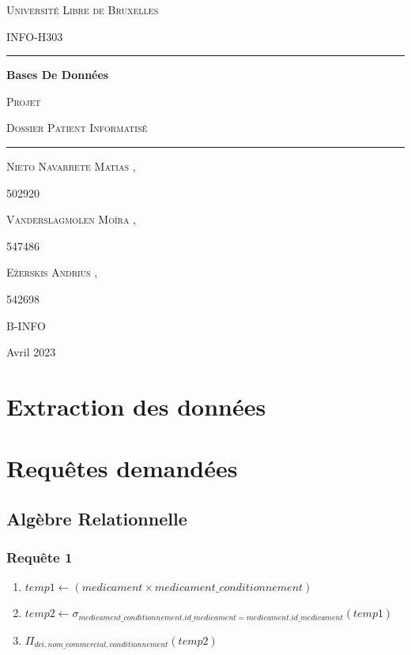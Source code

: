 \documentclass[utf8]{article}
\begin{document}
\begin{titlepage}
  \centering
  {\scshape\LARGE Université Libre de Bruxelles \par}
  \vspace{1cm}
  {\scshape\Large INFO-H303\par}
  \vspace{1.5cm}

  \noindent\rule{15cm}{0.4pt}
  \newline
  {\huge\bfseries Bases De Données\par}
  \vspace{0.5cm}
  {\scshape\Large Projet \par}
  \vspace{0.5cm}
  {\scshape\Large Dossier Patient Informatisé\par}
  \vspace{0.5cm}
  \noindent\rule{15cm}{0.4pt}
  \vfill

  {\Large\scshape Nieto Navarrete Matias , }
  {\Large\scshape 502920\par}
  {\Large\scshape Vanderslagmolen Moïra , }
  {\Large\scshape 547486\par}
  {\Large\scshape Ežerskis Andrius , }
  {\Large\scshape 542698\par}
  \vspace{0.5cm}
  {\Large\scshape B-INFO\par}
  \vspace{1cm}
  {\large Avril 2023\par}
\end{titlepage}
\tableofcontents
\newpage

\section{Extraction des données}

\section{Requêtes demandées}

\subsection{Algèbre Relationnelle}
\subsubsection{Requête 1}
\begin{enumerate}
  \item $temp1 \leftarrow (medicament \times medicament\_conditionnement)$
  \item $temp2 \leftarrow \sigma_{medicament\_conditionnement.id\_medicament = medicament.id\_medicament}(temp1)$
  \item $\Pi_{dci, nom\_commercial, conditionnement} (temp2)$
\end{enumerate}
\end{document}
